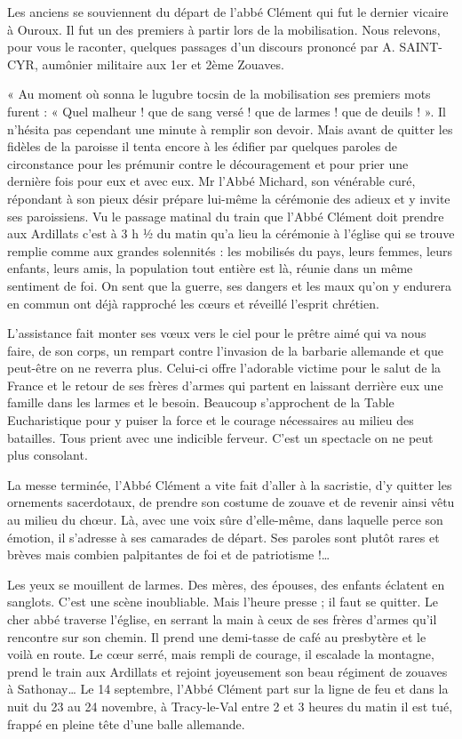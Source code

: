 Les anciens se souviennent du départ de l'abbé Clément qui fut le dernier vicaire à Ouroux. Il fut un des premiers à partir lors de la mobilisation. Nous relevons, pour vous le raconter, quelques passages d'un discours prononcé par A. SAINT-CYR, aumônier militaire aux 1er et 2ème Zouaves.

« Au moment où sonna le lugubre tocsin de la mobilisation ses premiers mots furent : « Quel malheur ! que de sang versé ! que de larmes ! que de deuils ! ». Il n'hésita pas cependant une minute à remplir son devoir. Mais avant de quitter les fidèles de la paroisse il tenta encore à les édifier par quelques paroles de circonstance pour les prémunir contre le découragement et pour prier une dernière fois pour eux et avec eux. Mr l'Abbé Michard, son vénérable curé, répondant à son pieux désir prépare lui-même la cérémonie des adieux et y invite ses paroissiens. Vu le passage matinal du train que l'Abbé Clément doit prendre aux Ardillats c'est à 3 h ½ du matin qu'a lieu la cérémonie à l'église qui se trouve remplie comme aux grandes solennités : les mobilisés du pays, leurs femmes, leurs enfants, leurs amis, la population tout entière est là, réunie dans un même sentiment de foi. On
sent que la guerre, ses dangers et les maux qu'on y endurera en commun ont déjà rapproché les cœurs et réveillé l'esprit chrétien.

L'assistance fait monter ses vœux vers le ciel pour le prêtre aimé qui va nous faire, de son corps, un rempart contre l'invasion de la barbarie allemande et que peut-être on ne reverra plus. Celui-ci offre l'adorable victime pour le salut de la France et le retour de ses frères d'armes qui partent en laissant derrière eux une famille dans les larmes et le besoin. Beaucoup s'approchent de la Table Eucharistique pour y puiser la force et le courage nécessaires au milieu des batailles. Tous prient avec une indicible ferveur. C'est un spectacle on ne peut plus consolant.

La messe terminée, l'Abbé Clément a vite fait d'aller à la sacristie, d'y quitter les ornements sacerdotaux, de prendre son costume de zouave et de revenir ainsi vêtu au milieu du chœur. Là, avec une voix sûre d'elle-même, dans laquelle perce son émotion, il s'adresse à ses camarades de départ. Ses paroles sont plutôt rares et brèves mais combien palpitantes de foi et de patriotisme !…

Les yeux se mouillent de larmes. Des mères, des épouses, des enfants éclatent en sanglots. C'est une scène inoubliable. Mais l'heure presse ; il faut se quitter. Le cher abbé traverse l'église, en serrant la main à ceux de ses frères d'armes qu'il rencontre sur son chemin. Il prend une demi-tasse de café au presbytère et le voilà en route. Le cœur serré, mais rempli de courage, il escalade la montagne, prend le train aux Ardillats et rejoint joyeusement son beau régiment de zouaves à Sathonay… Le 14 septembre, l'Abbé Clément part sur la ligne de feu et dans la nuit du 23 au 24 novembre, à Tracy-le-Val entre 2 et 3 heures du matin il est tué, frappé en pleine tête d'une balle allemande.

